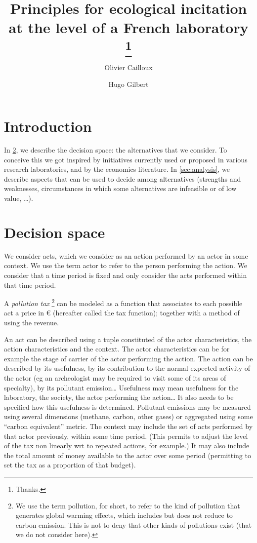 \documentclass[version=3.21, pagesize, twoside=off, bibliography=totoc, DIV=calc, fontsize=12pt, a4paper, french, english]{scrartcl}
\title{Principles for ecological incitation at the level of a French laboratory \thanks{Thanks.}}
\author{Olivier Cailloux}
\author{Hugo Gilbert}
\affil{Université Paris-Dauphine, PSL Research University, CNRS, LAMSADE, 75016 PARIS, FRANCE\\
	\href{mailto:olivier.cailloux@dauphine.fr}{olivier.cailloux@dauphine.fr}
}
\begin{document}
\maketitle

\section{Introduction}
\label{sec:intro}
In \cref{sec:alts}, we describe the decision space: the alternatives that we consider. To conceive this we got inspired by initiatives currently used or proposed in various research laboratories, and by the economics literature. In \cref{sec:analysis}, we describe aspects that can be used to decide among alternatives (strengths and weaknesses, circumstances in which some alternatives are infeasible or of low value, …).

\section{Decision space}
\label{sec:alts}
We consider acts, which we consider as an action performed by an actor in some context. We use the term actor to refer to the person performing the action. We consider that a time period is fixed and only consider the acts performed within that time period.

A \emph{pollution tax} 
\footnote{We use the term pollution, for short, to refer to the kind of pollution that generates global warming effects, which includes but does not reduce to carbon emission. This is not to deny that other kinds of pollutions exist (that we do not consider here).} 
can be modeled as a function that associates to each possible act a price in € (hereafter called the tax function); together with a method of using the revenue.

An act can be described using a tuple constituted of the actor characteristics, the action characteristics and the context.
The actor characteristics can be for example the stage of carrier of the actor performing the action.
The action can be described by its usefulness, by its contribution to the normal expected activity of the actor (eg an archeologist may be required to visit some of its areas of specialty), by its pollutant emission… 
Usefulness may mean usefulness for the laboratory, the society, the actor performing the action… It also needs to be specified how this usefulness is determined.
Pollutant emissions may be measured using several dimensions (methane, carbon, other gases) or aggregated using some “carbon equivalent” metric.
The context may include the set of acts performed by that actor previously, within some time period. (This permits to adjust the level of the tax non linearly wrt to repeated actions, for example.) It may also include the total amount of money available to the actor over some period (permitting to set the tax as a proportion of that budget).
\end{document}
